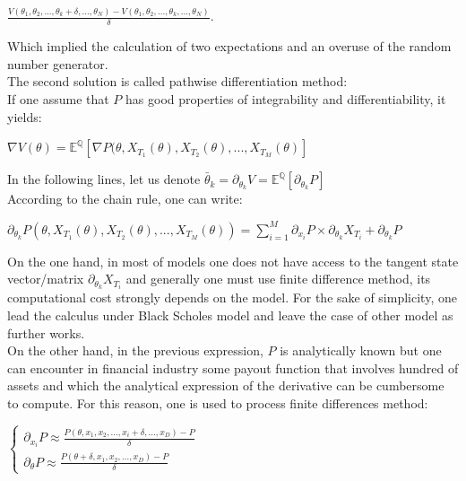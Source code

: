 \documentclass {article}
\begin{document}
		\begin{center}
			$\frac {V (\theta_{1}, \theta_{2}, ..., \theta_{k} + \delta, ..., \theta_{N}) - V (\theta_{1}, \theta_{2}, ..., \theta_{k}, ..., \theta_{N})}{\delta}$. \\
		\end{center}		
			
		Which implied the calculation of two expectations and an overuse of the random number generator. \\
		The second solution is called pathwise differentiation method: \\		
		If one assume that $P$ has good properties of integrability and differentiability, it yields: \\
		
			\begin{center}
				$\nabla{V} (\theta) = \mathbb{E}^{\mathbb{Q}}\left[ \nabla P (\theta, X_{T_{1}}(\theta), X_{T_{2}}(\theta), ..., X_{T_{M}}(\theta) \right]$
			\end{center}
		
		In the following lines, let us denote $\bar \theta_{k} = \partial_{\theta_{k}}V =  \mathbb{E}^{\mathbb{Q}}\left[ \partial_{\theta_{k}} P \right]$ \\
		
		According to the chain rule, one can write:
		
		\begin{center}
			$\partial_{\theta_{k}} P (\theta, X_{T_{1}}(\theta), X_{T_{2}}(\theta), ..., X_{T_{M}}(\theta)) = \sum_{i=1}^{M} {\partial_{x_{i}}P \times \partial_{\theta_{k}}}X_{T_{i}} + \partial_{\theta_{k}}P$
		\end{center}
		
		On the one hand, in most of models one does not have access to the tangent state vector/matrix $\partial_{\theta_{k}} X_{T_{i}}$ 
		and generally one must use finite difference method, its computational cost strongly depends on the model.
		For the sake of simplicity, one lead the calculus under Black Scholes model and leave the case of other model as further works. \\
		
		On the other hand, in the previous expression, $P$ is analytically known but one can encounter in financial industry some 
		payout function that involves hundred of assets and which the analytical expression of the derivative can be cumbersome to 
		compute. For this reason, one is used to process finite differences method: 
		
		\begin{center}
			$\begin{cases} \partial_{x_{i}}P \approx \frac{P (\theta, x_{1}, x_{2}, ..., x_{i}+\delta, ..., x_{D}) - P}{\delta} \\ \partial_{\theta} P \approx \frac{P (\theta + \delta, x_{1}, x_{2}, ..., x_{D}) - P}{\delta} \end{cases}$
		\end{center}
		
\end{document}
